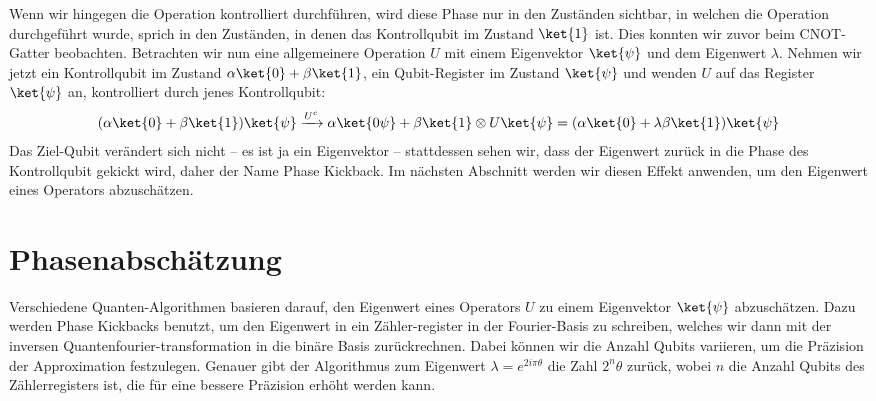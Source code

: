 Wenn wir hingegen die Operation kontrolliert durchführen, wird diese Phase nur in den Zuständen sichtbar, in welchen die Operation durchgeführt wurde, sprich in den Zuständen, in denen das Kontrollqubit im Zustand $\ket{1}$ ist. Dies konnten wir zuvor beim CNOT-Gatter beobachten. Betrachten wir nun eine allgemeinere Operation $U$ mit einem Eigenvektor $\ket{\psi}$ und dem Eigenwert $\lambda$. Nehmen wir jetzt ein Kontrollqubit im Zustand $\alpha\ket{0} + \beta\ket{1}$, ein Qubit-Register im Zustand $\ket{\psi}$ und wenden $U$ auf das Register $\ket{\psi}$ an, kontrolliert durch jenes Kontrollqubit:
\begin{align*}
(\alpha\ket{0} + \beta\ket{1})\ket{\psi} \xrightarrow{U^c} \alpha\ket{0\psi} + \beta\ket{1}\otimes U\ket{\psi} = (\alpha\ket{0} + \lambda\beta\ket{1})\ket{\psi}
\end{align*}
Das Ziel-Qubit verändert sich nicht – es ist ja ein Eigenvektor – stattdessen sehen wir, dass der Eigenwert zurück in die Phase des Kontrollqubit \grqq gekickt\grqq{} wird, daher der Name \grqq Phase Kickback\grqq{}. Im nächsten Abschnitt werden wir diesen Effekt anwenden, um den Eigenwert eines Operators abzuschätzen.

\section{Phasenabschätzung}
Verschiedene Quanten-Algorithmen basieren darauf, den Eigenwert eines Operators $U$ zu einem Eigenvektor $\ket{\psi}$ abzuschätzen. Dazu werden Phase Kickbacks benutzt, um den Eigenwert in ein Zähler-register in der Fourier-Basis zu schreiben, welches wir dann mit der inversen Quantenfourier-transformation in die binäre Basis zurückrechnen. Dabei können wir die Anzahl Qubits variieren, um die Präzision der Approximation festzulegen. Genauer gibt der Algorithmus zum Eigenwert $\lambda = e^{2i\pi\theta}$ die Zahl $2^n\theta$ zurück, wobei $n$ die Anzahl Qubits des Zählerregisters ist, die für eine bessere Präzision erhöht werden kann. 
